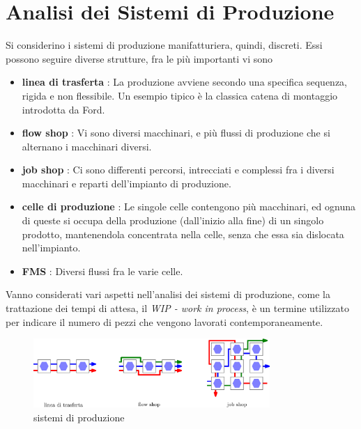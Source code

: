 \documentclass[10pt, letterpaper]{report}
\begin{document}
\section{Analisi dei Sistemi di Produzione}
Si considerino i sistemi di produzione manifatturiera, quindi, discreti. Essi possono seguire diverse strutture, 
fra le più importanti vi sono\begin{itemize}
    \item \textbf{linea di trasferta } : La produzione avviene secondo una specifica sequenza, rigida e non 
    flessibile. Un esempio tipico è la classica catena di montaggio introdotta da Ford. 
    \item \textbf{flow shop} : Vi sono diversi macchinari, e più flussi di produzione che si 
    alternano i macchinari diversi. 
    \item \textbf{job shop} : Ci sono differenti percorsi, intrecciati e complessi fra i diversi macchinari 
    e reparti dell'impianto di produzione. 
    \item  \textbf{celle di produzione} : Le singole celle contengono più macchinari, ed ognuna di queste 
    si occupa della produzione (dall'inizio alla fine) di un singolo prodotto, mantenendola concentrata 
    nella celle, senza che essa sia dislocata nell'impianto. 
    \item \textbf{FMS} : Diversi flussi fra le varie celle.
\end{itemize}
Vanno considerati vari aspetti nell'analisi dei sistemi di produzione, come la trattazione dei tempi di 
attesa, il \textit{WIP - work in process}, è un termine utilizzato per indicare il numero di pezzi che vengono 
lavorati contemporaneamente.
\begin{figure}[h!]
    \centering
    \includegraphics[width=0.8\textwidth ]{images/lineaFlowJob.eps}
    \caption{sistemi di produzione}
    \label{fig:sisprod}
\end{figure} 
\end{document}
